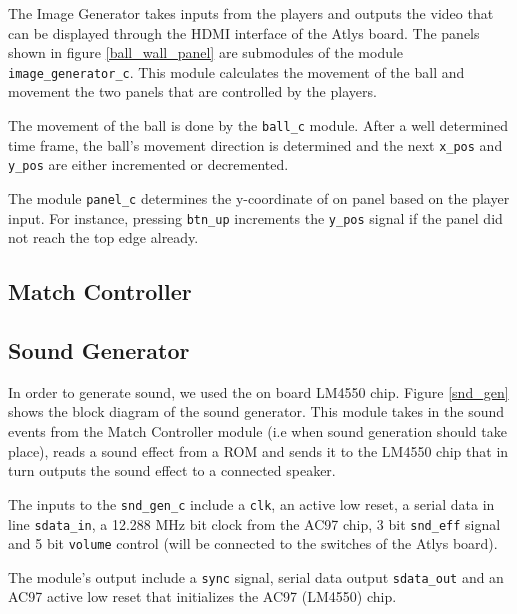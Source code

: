         The Image Generator takes inputs from the players and outputs the video that can be displayed through the HDMI interface of the Atlys board. The panels shown in figure \ref{ball_wall_panel} are submodules of the module \texttt{image\_generator\_c}.
		This module calculates the movement of the ball and movement the two panels that are controlled by the players. 
		
		The movement of the ball is done by the \texttt{ball\_c} module.
		After a well determined time frame, the ball's movement direction is determined and the next \texttt{x\_pos} and \texttt{y\_pos} are either incremented or decremented. 
		
		The module \texttt{panel\_c} determines the y-coordinate of on panel based on the player input. For instance, pressing \texttt{btn\_up} increments the \texttt{y\_pos} signal if the panel did not reach the top edge already. 


    \subsection{Match Controller}
    
    \newpage
	  \subsection{Sound Generator}
				In order to generate sound, we used the on board LM4550 chip. Figure \ref{snd_gen} shows the block diagram of the sound generator. This module takes in the sound events from the Match Controller module (i.e when sound generation should take place), reads a sound effect from a ROM and sends it to the LM4550 chip that in turn outputs the sound effect to a connected speaker.
				
				The inputs to the \texttt{snd\_gen\_c} include a \texttt{clk}, an active low reset, a serial data in line \texttt{sdata\_in}, a 12.288 MHz bit clock from the AC97 chip, 3 bit \texttt{snd\_eff} signal and 5 bit \texttt{volume} control (will be connected to the switches of the Atlys board).
				
				The module's output include a \texttt{sync} signal, serial data output \texttt{sdata\_out} and an AC97 active low reset that initializes the AC97 (LM4550) chip. 
				

